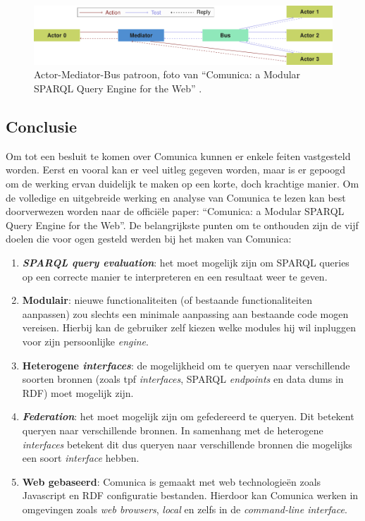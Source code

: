 \begin{figure}
    \centering
    \includegraphics[width=0.5\linewidth]{images/comunica-actor-mediator-bus.png}
    \caption{Actor-Mediator-Bus patroon, foto van ``Comunica: a Modular SPARQL Query Engine for the Web'' \cite{taelman2018comunica}.}
    \label{fig:actor-mediator-bus}
\end{figure}



\subsection{Conclusie}
Om tot een besluit te komen over Comunica kunnen er enkele feiten vastgesteld worden. Eerst en vooral kan er veel uitleg gegeven worden, maar is er gepoogd om de werking ervan duidelijk te maken op een korte, doch krachtige manier. Om de volledige en uitgebreide werking en analyse van Comunica te lezen kan best doorverwezen worden naar de officiële paper: ``Comunica: a Modular SPARQL Query Engine for the Web''. De belangrijkste punten om te onthouden zijn de vijf doelen die voor ogen gesteld werden bij het maken van Comunica:
\begin{enumerate}
    \item \textbf{\textit{SPARQL query evaluation}}: het moet mogelijk zijn om SPARQL queries op een correcte manier te interpreteren en een resultaat weer te geven.
    \item \textbf{Modulair}: nieuwe functionaliteiten (of bestaande functionaliteiten aanpassen) zou slechts een minimale aanpassing aan bestaande code mogen vereisen. Hierbij kan de gebruiker zelf kiezen welke modules hij wil inpluggen voor zijn persoonlijke \textit{engine}.
    \item \textbf{Heterogene \textit{interfaces}}: de mogelijkheid om te queryen naar verschillende soorten bronnen (zoals \acrshort{tpf} \textit{interfaces}, SPARQL \textit{endpoints} en data dums in RDF) moet mogelijk zijn.
    \item \textbf{\textit{Federation}}: het moet mogelijk zijn om gefedereerd te queryen. Dit betekent queryen naar verschillende bronnen. In samenhang met de heterogene \textit{interfaces} betekent dit dus queryen naar verschillende bronnen die mogelijks een soort \textit{interface} hebben.
    \item \textbf{Web gebaseerd}: Comunica is gemaakt met web technologieën zoals Javascript en RDF configuratie bestanden. Hierdoor kan Comunica werken in omgevingen zoals \textit{web browsers}, \textit{local} en zelfs in de \textit{command-line interface}.
\end{enumerate}